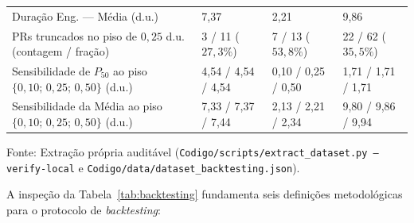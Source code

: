 \documentclass[12pt,openany,oneside,a4paper,english,brazilian,sumario=tradicional]{abntex2}
\begin{document}
\begin{table}[htbp]
\begin{tabularx}{\textwidth}{L{5.2cm} Y Y Y}
Duração Eng. --- Média (d.u.) & 7,37 & 2,21 & 9,86\\
PRs truncados no piso de $0{,}25$ d.u. (contagem / fração) & 3 / 11 ($27{,}3\%$) & 7 / 13 ($53{,}8\%$) & 22 / 62 ($35{,}5\%$)\\
Sensibilidade de $P_{50}$ ao piso $\{0{,}10;\,0{,}25;\,0{,}50\}$ (d.u.) & 4,54 / 4,54 / 4,54 & 0,10 / 0,25 / 0,50 & 1,71 / 1,71 / 1,71\\
Sensibilidade da Média ao piso $\{0{,}10;\,0{,}25;\,0{,}50\}$ (d.u.) & 7,33 / 7,37 / 7,44 & 2,13 / 2,21 / 2,34 & 9,80 / 9,86 / 9,94\\
\bottomrule
\end{tabularx}
{\small Fonte: Extração própria auditável (\texttt{Codigo/\allowbreak scripts/\allowbreak }\allowbreak\texttt{extract\_\allowbreak dataset.py --verify-local} e \texttt{Codigo/\allowbreak data/\allowbreak }\allowbreak\texttt{dataset\_\allowbreak backtesting.json}).}
\end{table}

A inspeção da Tabela~\ref{tab:backtesting} fundamenta seis definições metodológicas para o protocolo de \textit{backtesting}:
\end{document}
